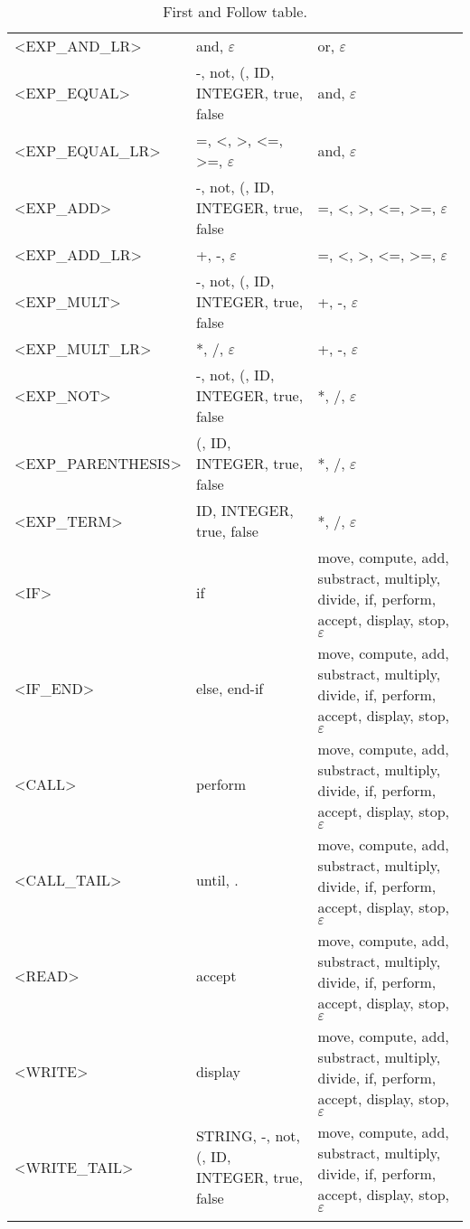 \documentclass[a4paper,11pt]{article}
\begin{document}
\begin{longtable}{l>{\raggedright}p{6cm}p{6cm}}
	<EXP\_AND\_LR> & and, $\varepsilon$ & or, $\varepsilon$ \\
	<EXP\_EQUAL> & -, not, (, ID, INTEGER, true, false & and, $\varepsilon$ \\
	<EXP\_EQUAL\_LR> & =, <, >, <=, >=, $\varepsilon$ & and, $\varepsilon$ \\
	<EXP\_ADD> & -, not, (, ID, INTEGER, true, false & =, <, >, <=, >=, $\varepsilon$ \\
	<EXP\_ADD\_LR> & +, -, $\varepsilon$ & =, <, >, <=, >=, $\varepsilon$ \\
	<EXP\_MULT> & -, not, (, ID, INTEGER, true, false & +, -, $\varepsilon$ \\
	<EXP\_MULT\_LR> & *, /, $\varepsilon$ & +, -, $\varepsilon$ \\
	<EXP\_NOT> & -, not, (, ID, INTEGER, true, false & *, /, $\varepsilon$ \\
	<EXP\_PARENTHESIS> & (, ID, INTEGER, true, false & *, /, $\varepsilon$ \\
	<EXP\_TERM> & ID, INTEGER, true, false & *, /, $\varepsilon$ \\
	<IF> & if & move, compute, add, substract, multiply, divide, if, perform, accept, display, stop, $\varepsilon$ \\
	<IF\_END> & else, end-if & move, compute, add, substract, multiply, divide, if, perform, accept, display, stop, $\varepsilon$ \\
	<CALL> & perform & move, compute, add, substract, multiply, divide, if, perform, accept, display, stop, $\varepsilon$ \\
	<CALL\_TAIL> & until, . & move, compute, add, substract, multiply, divide, if, perform, accept, display, stop, $\varepsilon$ \\
	<READ> & accept & move, compute, add, substract, multiply, divide, if, perform, accept, display, stop, $\varepsilon$ \\
	<WRITE> & display & move, compute, add, substract, multiply, divide, if, perform, accept, display, stop, $\varepsilon$ \\
	<WRITE\_TAIL> & STRING, -, not, (, ID, INTEGER, true, false & move, compute, add, substract, multiply, divide, if, perform, accept, display, stop, $\varepsilon$ \\
	\caption{First and Follow table.}
\end{longtable}
\end{document}
